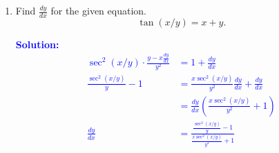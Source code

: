 \documentclass[letterpaper,11pt]{article}
\newcommand{\sol}[2]{\begin{minipage}[c][#1]{\linewidth}{\textcolor{blue}{\textbf{Solution:}}\quad \textcolor{blue}{#2}}\end{minipage}}
\newcommand{\sol}[2]{\begin{minipage}[c][#1]{\linewidth}{\vfill}\end{minipage}}
\begin{document}
\begin{enumerate}
\item Find $\frac{dy}{dx}$ for the given equation.
\[\tan(x/y) = x + y.\]
\sol{}{
\begin{align*}
    \sec^2(x/y) \cdot \frac{y - x \frac{dy}{dx}}{y^2} & = 1 + \frac{dy}{dx}\\
    \frac{\sec^2(x/y)}{y} - 1 &= \frac{x\sec^2(x/y)}{y^2} \frac{dy}{dx} + \frac{dy}{dx}\\
    & = \frac{dy}{dx}(\frac{x\sec^2(x/y)}{y^2} + 1)\\
    \frac{dy}{dx} & = \frac{\frac{\sec^2(x/y)}{y} - 1}{\frac{x\sec^2(x/y)}{y^2} + 1}
\end{align*}}
\vfill
\end{enumerate}
\end{document}
